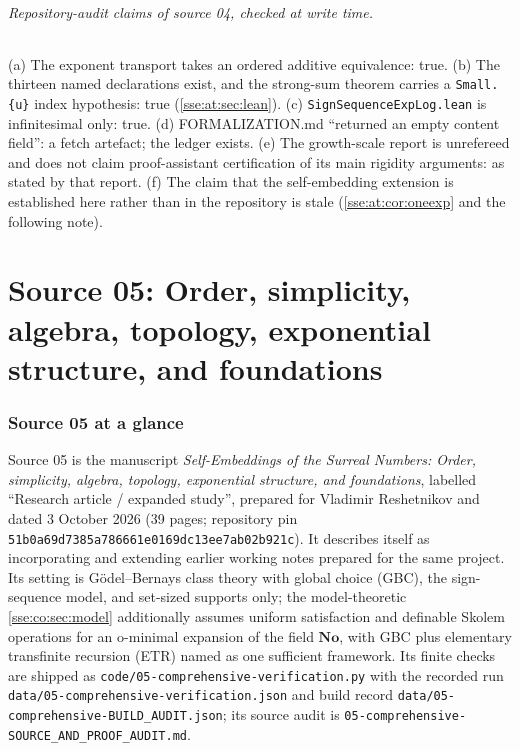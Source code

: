 \documentclass[11pt,a4paper]{article}
\numberwithin{equation}{section}
\theoremstyle{plain}
\theoremstyle{definition}
\theoremstyle{remark}
\newcommand{\No}{\mathbf{No}}
\newcommand{\code}[1]{\texttt{\small #1}}
\newcommand{\fn}[1]{\nolinkurl{#1}}%
\begin{document}
\paragraph{Repository-audit claims of source 04, checked at write time.}
(a) The exponent transport takes an ordered additive equivalence: true.
(b) The thirteen named declarations exist, and the strong-sum theorem carries
a \code{Small.\{u\}} index hypothesis: true (\cref{sse:at:sec:lean}).
(c) \fn{SignSequenceExpLog.lean} is infinitesimal only: true.
(d) FORMALIZATION.md ``returned an empty content field'': a fetch artefact;
the ledger exists. (e) The growth-scale report is unrefereed and does not
claim proof-assistant certification of its main rigidity arguments: as stated
by that report. (f) The claim that the self-embedding extension is
established here rather than in the repository is stale
(\cref{sse:at:cor:oneexp} and the following note).
\part{Source 05: Order, simplicity, algebra, topology, exponential structure, and foundations}\label{sse:part:co}

\section{Source 05 at a glance}\label{sse:co:sec:glance}

Source 05 is the manuscript \emph{Self-Embeddings of the Surreal Numbers:
Order, simplicity, algebra, topology, exponential structure, and
foundations}, labelled ``Research article / expanded study'', prepared for
Vladimir Reshetnikov and dated 3 October 2026 (39 pages; repository pin
\code{51b0a69d7385a786661e0169dc13ee7ab02b921c}). It describes itself as
incorporating and extending earlier working notes prepared for the same
project. Its setting is G\"odel--Bernays class theory with global choice
(GBC), the sign-sequence model, and set-sized supports only; the
model-theoretic \cref{sse:co:sec:model} additionally assumes uniform
satisfaction and definable Skolem operations for an o-minimal expansion of
the field $\No$, with GBC plus elementary transfinite recursion (ETR) named
as one sufficient framework. Its finite checks are shipped as
\fn{code/05-comprehensive-verification.py} with the recorded run
\fn{data/05-comprehensive-verification.json} and build record
\fn{data/05-comprehensive-BUILD_AUDIT.json}; its source audit is
\fn{05-comprehensive-SOURCE_AND_PROOF_AUDIT.md}.
\end{document}
